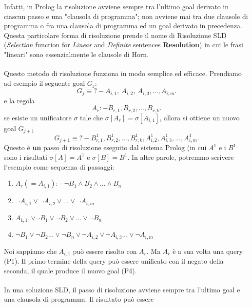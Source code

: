 \documentclass[11pt]{article}
\begin{document}
Infatti, in Prolog la risoluzione avviene sempre tra l'ultimo goal derivato in ciascun passo e una "clausola di programma"; non avviene mai tra due clausole di programma o fra una clausola di programma ed un goal derivato in precedenza. 
Questa particolare forma di risoluzione prende il nome di \color{blue} Risoluzione SLD \color{black} (\textit{Selection} function for \textit{Linear} and \textit{Definite} sentences \textbf{Resolution}) in cui le frasi "lineari" sono essenzialmente le clausole di Horn.
\\ \\
Questo metodo di risoluzione funziona in modo semplice ed efficace. Prendiamo ad esempio il seguente goal $G_j$:
\begin{equation}
G_j \equiv ?- A_{i,1}, \: A_{i,2}, \: A_{i,3},...,A_{i,m}.
\end{equation}
e la regola 
\begin{equation}
A_r :- B_{r,1}, B_{r,2}, ...,B_{r,k}.
\end{equation}
se esiste un unificatore $\sigma$ tale che $\sigma [A_r] = \sigma [A_{i,1}]$, allora si ottiene un nuovo  goal $G_{j+1}$
\begin{equation}
G_{j+1} \equiv ?- B^1_{r,1}, B^1_{r,2}, ... ,B^1_{r,k}, A^1_{i, 2},A^1_{i, 3},...,A^1_{i, m}.
\end{equation}
Questo è \textbf{un} passo di risoluzione eseguito dal sistema Prolog (in cui $A^1$ e i $B^1$ sono i risultati $\sigma [A] = A^1$ e $\sigma [B] = B^1$.
In altre parole, potremmo scrivere l'esempio come sequenza di passaggi:
\begin{enumerate}[label=(P\arabic*)]
	\item $A_r (=A_{i,1}) :- \neg B_1 \wedge B_2 \wedge ... \wedge B_n$
	\item $\neg A_{i,1} \vee \neg A_{i,2} \vee ... \vee \neg A_{i,m}$
	\item $A_{1,1}, \vee \neg B_1 \vee \neg B_2 \vee ... \vee \neg B_n$
	\item $\neg B_1 \vee \neg B_2 ... \vee \neg B_n \vee \neg A_{i,2} \vee \neg A_{i,3} ... \vee \neg A_{i,m} $
\end{enumerate}
Noi sappiamo che $A_{i,1}$ può essere risolto con $A_r$. Ma $A_r$ è a sua volta una query (P1). Il primo termine della query può essere unificato con il negato della seconda, il quale produce il nuovo goal (P4).
\\ \\
In una soluzione SLD, il passo di risoluzione avviene sempre tra l'ultimo goal e una clausola di programma. Il risultato può essere
\end{document}
